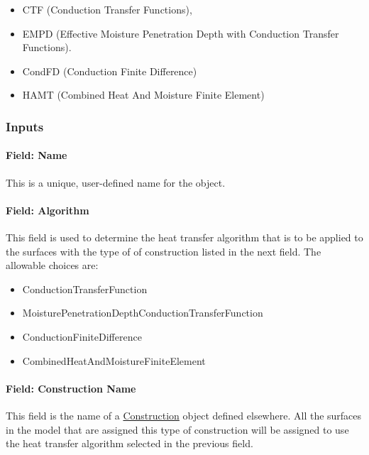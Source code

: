 \begin{itemize}
\item
  CTF (Conduction Transfer Functions),
\item
  EMPD (Effective Moisture Penetration Depth with Conduction Transfer Functions).
\item
  CondFD (Conduction Finite Difference)
\item
  HAMT (Combined Heat And Moisture Finite Element)
\end{itemize}

\subsubsection{Inputs}\label{inputs-3}

\paragraph{Field: Name}

This is a unique, user-defined name for the object.

\paragraph{Field: Algorithm}\label{field-algorithm-3}

This field is used to determine the heat transfer algorithm that is to be applied to the surfaces with the type of of construction listed in the next field. The allowable choices are:

\begin{itemize}
\item
  ConductionTransferFunction
\item
  MoisturePenetrationDepthConductionTransferFunction
\item
  ConductionFiniteDifference
\item
  CombinedHeatAndMoistureFiniteElement
\end{itemize}

\paragraph{Field: Construction Name}\label{field-construction-name}

This field is the name of a \hyperref[construction-000]{Construction} object defined elsewhere. All the surfaces in the model that are assigned this type of construction will be assigned to use the heat transfer algorithm selected in the previous field.

